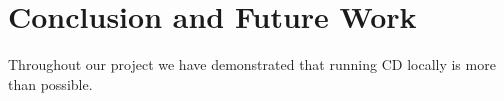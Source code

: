 \chapter{Conclusion and Future Work}
\label{chap:conclusion}

Throughout our project we have demonstrated that running \acrshort{CD} locally is more than possible.



